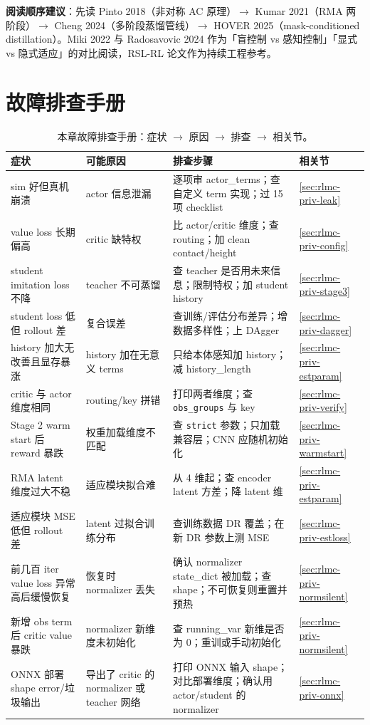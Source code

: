 \textbf{阅读顺序建议}：先读 Pinto 2018（非对称 AC 原理）$\to$ Kumar 2021（RMA 两阶段）$\to$ Cheng 2024（多阶段蒸馏管线）$\to$ HOVER 2025（mask-conditioned distillation）。Miki 2022 与 Radosavovic 2024 作为「盲控制 vs 感知控制」「显式 vs 隐式适应」的对比阅读，RSL-RL 论文作为持续工程参考。

\section*{故障排查手册}
\label{sec:rlmc-priv-trouble}

\begin{table}[H]
\centering
\small
\caption{本章故障排查手册：症状 $\to$ 原因 $\to$ 排查 $\to$ 相关节。}
\label{tab:rlmc-priv-troubleshoot}
\begin{tabular}{@{}p{3.4cm}p{2.8cm}p{4.6cm}p{1.8cm}@{}}
\toprule
症状 & 可能原因 & 排查步骤 & 相关节 \\
\midrule
sim 好但真机崩溃 & actor 信息泄漏 & 逐项审 actor\_terms；查自定义 term 实现；过 15 项 checklist & \cref{sec:rlmc-priv-leak} \\
value loss 长期偏高 & critic 缺特权 & 比 actor/critic 维度；查 routing；加 clean contact/height & \cref{sec:rlmc-priv-config} \\
student imitation loss 不降 & teacher 不可蒸馏 & 查 teacher 是否用未来信息；限制特权；加 student history & \cref{sec:rlmc-priv-stage3} \\
student loss 低但 rollout 差 & 复合误差 & 查训练/评估分布差异；增数据多样性；上 DAgger & \cref{sec:rlmc-priv-dagger} \\
history 加大无改善且显存暴涨 & history 加在无意义 terms & 只给本体感知加 history；减 history\_length & \cref{sec:rlmc-priv-estparam} \\
critic 与 actor 维度相同 & routing/key 拼错 & 打印两者维度；查 \texttt{obs\_groups} 与 key & \cref{sec:rlmc-priv-verify} \\
Stage 2 warm start 后 reward 暴跌 & 权重加载维度不匹配 & 查 \texttt{strict} 参数；只加载兼容层；CNN 应随机初始化 & \cref{sec:rlmc-priv-warmstart} \\
RMA latent 维度过大不稳 & 适应模块拟合难 & 从 4 维起；查 encoder latent 方差；降 latent 维 & \cref{sec:rlmc-priv-estparam} \\
适应模块 MSE 低但 rollout 差 & latent 过拟合训练分布 & 查训练数据 DR 覆盖；在新 DR 参数上测 MSE & \cref{sec:rlmc-priv-estloss} \\
前几百 iter value loss 异常高后缓慢恢复 & 恢复时 normalizer 丢失 & 确认 normalizer state\_dict 被加载；查 shape；不可恢复则重置并预热 & \cref{sec:rlmc-priv-normsilent} \\
新增 obs term 后 critic value 暴跌 & normalizer 新维度未初始化 & 查 running\_var 新维是否为 0；重训或手动初始化 & \cref{sec:rlmc-priv-normsilent} \\
ONNX 部署 shape error/垃圾输出 & 导出了 critic 的 normalizer 或 teacher 网络 & 打印 ONNX 输入 shape；对比部署维度；确认用 actor/student 的 normalizer & \cref{sec:rlmc-priv-onnx} \\
\bottomrule
\end{tabular}
\end{table}

